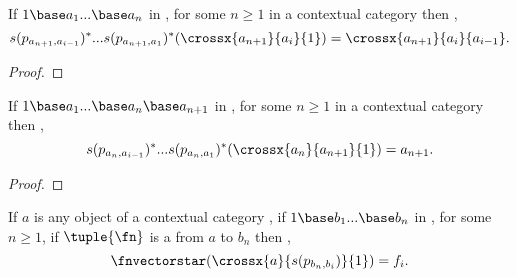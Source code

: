 \begin{lemma}
If $1 \base a_1 ... \base a_n$ in \catc, for some $n \ge 1$ in a contextual category \catc then \foreachi,
\begin{equation*}
s(p_{a_{n+1},a_{i-1}})^*...s(p_{a_{n+1},a_1})^*(\crossx{a_{n+1}}{a_i}{1}) 
= \crossx{a_{n+1}}{a_i}{a_{i-1}}.
\end{equation*} 
\end{lemma}
\begin{proof}
\end{proof}
\begin{lemma}
If $1 \base a_1 ... \base a_n \base a_{n+1}$ in \catc, for some $n \ge 1$ in a contextual category \catc then \foreachi,
\begin{equation*}
s(p_{a_{n},a_{i-1}})^*...s(p_{a_{n},a_1})^*(\crossx{a_{n}}{a_{n+1}}{1}) = a_{n+1}.
\end{equation*} 
\end{lemma}
\begin{proof}
\end{proof}


\begin{lemma}
If $a$ is any object of a contextual category \catcw, if $1 \base b_1 ... \base b_n$ in \catc, for some $n \ge 1$, 
if $\tuple{\fn}$ is a  from $a$ to $b_n$ then \foreachi,
\begin{equation}
\fnvectorstar(\crossx{a}{s(p_{b_n,b_i})}{1})=f_i.                                    
\end{equation}
\end{lemma}

